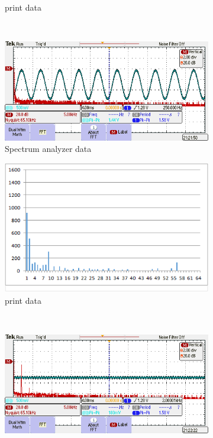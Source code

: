 \documentclass[a4paper]{article}
\newlength{\pic}
\begin{document}
\begin{figure}[htp]
\begin{subfigure}[H]{\picc}
	\caption{print data}
	\end{subfigure}
	\\
	\begin{subfigure}[H]{\picb}
	\includegraphics[width=\picb]{oscilloscope/fft250}
	\caption{Spectrum analyzer data}
	\end{subfigure}
	\begin{subfigure}[H]{\picc}
	\includegraphics[width=\picc]{Plots/P3_FFT250}
	\caption{print data}
	\end{subfigure}
	\\
	\begin{subfigure}[H]{\picb}
	\includegraphics[width=\picb]{oscilloscope/fft2000}

\end{subfigure}
\end{figure}
\end{document}
